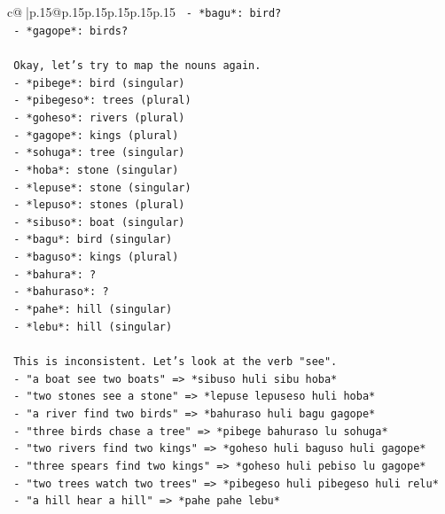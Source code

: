 \documentclass{article}
\begin{document}
{\begin{supertabular}{c@{$\;$}|p{.15\linewidth}@{}p{.15\linewidth}p{.15\linewidth}p{.15\linewidth}p{.15\linewidth}p{.15\linewidth}}
{{{\texttt{   {-} *bagu*: bird?} \\
\texttt{   {-} *gagope*: birds?} \\
\\ 
\texttt{   Okay, let's try to map the nouns again.} \\
\texttt{   {-} *pibege*: bird (singular)} \\
\texttt{   {-} *pibegeso*: trees (plural)} \\
\texttt{   {-} *goheso*: rivers (plural)} \\
\texttt{   {-} *gagope*: kings (plural)} \\
\texttt{   {-} *sohuga*: tree (singular)} \\
\texttt{   {-} *hoba*: stone (singular)} \\
\texttt{   {-} *lepuse*: stone (singular)} \\
\texttt{   {-} *lepuso*: stones (plural)} \\
\texttt{   {-} *sibuso*: boat (singular)} \\
\texttt{   {-} *bagu*: bird (singular)} \\
\texttt{   {-} *baguso*: kings (plural)} \\
\texttt{   {-} *bahura*: ?} \\
\texttt{   {-} *bahuraso*: ?} \\
\texttt{   {-} *pahe*: hill (singular)} \\
\texttt{   {-} *lebu*: hill (singular)} \\
\\ 
\texttt{   This is inconsistent. Let's look at the verb "see".} \\
\texttt{   {-} "a boat see two boats" => *sibuso huli sibu hoba*} \\
\texttt{   {-} "two stones see a stone" => *lepuse lepuseso huli hoba*} \\
\texttt{   {-} "a river find two birds" => *bahuraso huli bagu gagope*} \\
\texttt{   {-} "three birds chase a tree" => *pibege bahuraso lu sohuga*} \\
\texttt{   {-} "two rivers find two kings" => *goheso huli baguso huli gagope*} \\
\texttt{   {-} "three spears find two kings" => *goheso huli pebiso lu gagope*} \\
\texttt{   {-} "two trees watch two trees" => *pibegeso huli pibegeso huli relu*} \\
\texttt{   {-} "a hill hear a hill" => *pahe pahe lebu*} \\
}}}
\end{supertabular}}
\end{document}
